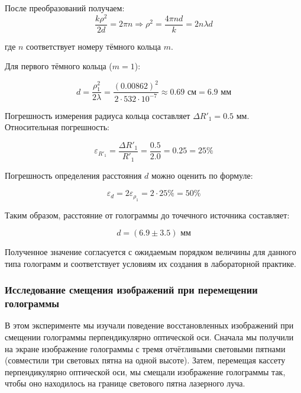 После преобразований получаем:
\begin{equation}
    \frac{k\rho^2}{2d} = 2\pi n \Rightarrow \rho^2 = \frac{4\pi n d}{k} = 2n\lambda d
\end{equation}

где $n$ соответствует номеру тёмного кольца $m$.

Для первого тёмного кольца ($m = 1$):

\begin{equation}
    d = \frac{\rho_1^2}{2\lambda} = \frac{(0.00862)^2}{2 \cdot 532 \cdot 10^{-7}} \approx 0.69 \text{ см} = 6.9 \text{ мм}
\end{equation}

Погрешность измерения радиуса кольца составляет $\Delta R'_1 = 0.5$ мм. Относительная погрешность:

\begin{equation}
    \varepsilon_{R'_1} = \frac{\Delta R'_1}{R'_1} = \frac{0.5}{2.0} = 0.25 = 25\%
\end{equation}

Погрешность определения расстояния $d$ можно оценить по формуле:

\begin{equation}
    \varepsilon_d = 2\varepsilon_{\rho_1} = 2 \cdot 25\% = 50\%
\end{equation}

Таким образом, расстояние от голограммы до точечного источника составляет:

\begin{equation}
    d = (6.9 \pm 3.5) \text{ мм}
\end{equation}

Полученное значение согласуется с ожидаемым порядком величины для данного типа голограмм и соответствует условиям их создания в лабораторной практике.

\subsubsection{Исследование смещения изображений при перемещении голограммы}

В этом эксперименте мы изучали поведение восстановленных изображений при смещении голограммы перпендикулярно оптической оси. Сначала мы получили на экране изображение голограммы с тремя отчётливыми световыми пятнами (совместили три световых пятна на одной высоте). Затем, перемещая кассету перпендикулярно оптической оси, мы смещали изображение голограммы так, чтобы оно находилось на границе светового пятна лазерного луча.

